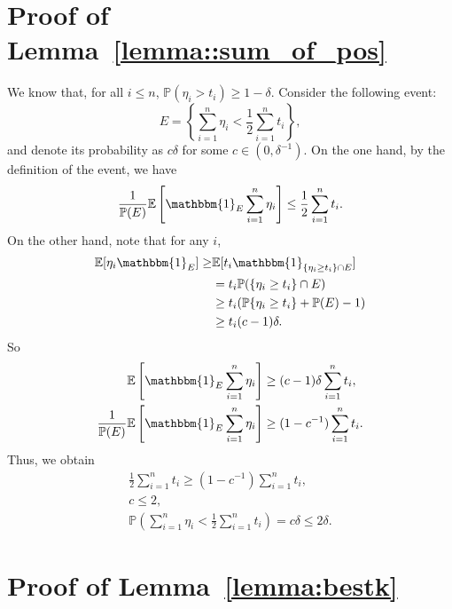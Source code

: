 \documentclass[11pt,notitlepage]{article}
\newcommand\E {\mathbb{E}}
\newcommand\Pbb {\mathbb{P}}
\newcommand\ind {\mathbbm{1}}
\begin{document}
\section{Proof of Lemma~\ref{lemma::sum_of_pos}}
\label{appendix:sum_of_pos}
  We know that, for all $i\le n$,
    $ \Pbb(\eta_i > t_i) \geq 1 - \delta$.
  Consider the following event: 
    \[
      E = \left\{\sum_{i=1}^n \eta_i < \frac12\sum_{i=1}^n
      t_i\right\},
    \]
  and denote its probability as $ c\delta$ for some $c \in (0,\delta^{-1})$. 
  On the one hand, by the definition of the event, we have
    \[
      \frac{1}{\Pbb(E)}\E\left[\ind_E \sum_{i=1}^n \eta_i\right] \leq \frac12\sum_{i=1}^n t_i.
    \]
  On the other hand, note that for any $i$,
    \begin{align*}
      \E[\eta_i \ind_{E}] \geq& \E[ t_i\ind_{\{\eta_i\geq t_i\} \cap E} ]\\
        &= t_i \Pbb(\{\eta_i\geq t_i\} \cap E)\\
        &\geq t_i( \Pbb\{\eta_i\geq t_i\} +\Pbb(E) -1)\\
        &\geq t_i(c-1)\delta.
    \end{align*}
  So
    \begin{align*}
      \E\left[\ind_E \sum_{i=1}^n \eta_i\right]
        & \geq (c-1)\delta\sum_{i=1}^n t_i, \\
      \frac{1}{\Pbb(E)}\E\left[\ind_E \sum_{i=1}^n \eta_i\right]
        & \geq (1-c^{-1})\sum_{i=1}^n t_i.
    \end{align*}
  Thus, we obtain
    \begin{gather*}
      \frac12\sum_{i=1}^n t_i \geq (1-c^{-1})\sum_{i=1}^n t_i, \\
      c \leq 2, \\
      \Pbb\left(\sum_{i=1}^n\eta_i < \frac12\sum_{i=1}^n t_i\right) = c\delta \leq 2\delta.
    \end{gather*}

\section{Proof of Lemma~\ref{lemma:bestk}}
\label{appendix:bestk}
\end{document}
